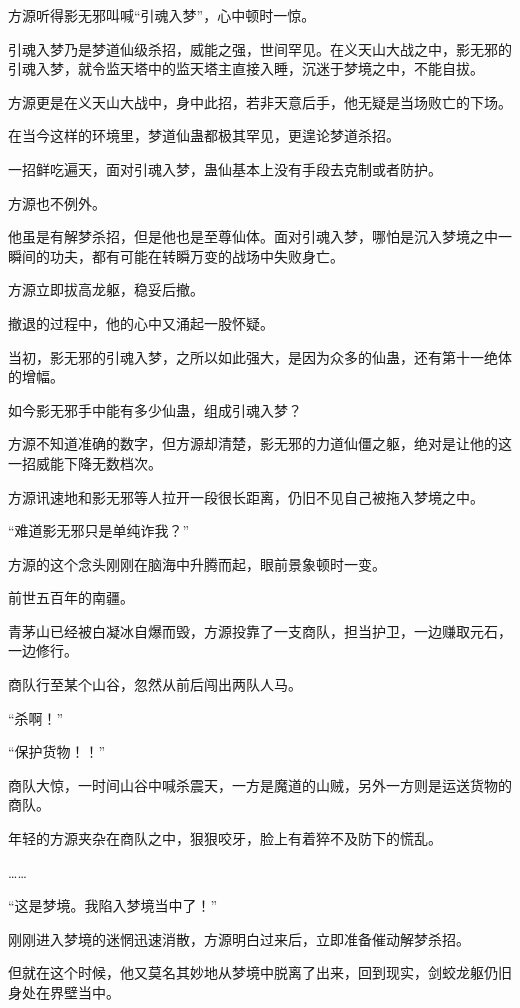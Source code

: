 
\begin{this_body}

方源听得影无邪叫喊“引魂入梦”，心中顿时一惊。

引魂入梦乃是梦道仙级杀招，威能之强，世间罕见。在义天山大战之中，影无邪的引魂入梦，就令监天塔中的监天塔主直接入睡，沉迷于梦境之中，不能自拔。

方源更是在义天山大战中，身中此招，若非天意后手，他无疑是当场败亡的下场。

在当今这样的环境里，梦道仙蛊都极其罕见，更遑论梦道杀招。

一招鲜吃遍天，面对引魂入梦，蛊仙基本上没有手段去克制或者防护。

方源也不例外。

他虽是有解梦杀招，但是他也是至尊仙体。面对引魂入梦，哪怕是沉入梦境之中一瞬间的功夫，都有可能在转瞬万变的战场中失败身亡。

方源立即拔高龙躯，稳妥后撤。

撤退的过程中，他的心中又涌起一股怀疑。

当初，影无邪的引魂入梦，之所以如此强大，是因为众多的仙蛊，还有第十一绝体的增幅。

如今影无邪手中能有多少仙蛊，组成引魂入梦？

方源不知道准确的数字，但方源却清楚，影无邪的力道仙僵之躯，绝对是让他的这一招威能下降无数档次。

方源讯速地和影无邪等人拉开一段很长距离，仍旧不见自己被拖入梦境之中。

“难道影无邪只是单纯诈我？”

方源的这个念头刚刚在脑海中升腾而起，眼前景象顿时一变。

前世五百年的南疆。

青茅山已经被白凝冰自爆而毁，方源投靠了一支商队，担当护卫，一边赚取元石，一边修行。

商队行至某个山谷，忽然从前后闯出两队人马。

“杀啊！”

“保护货物！！”

商队大惊，一时间山谷中喊杀震天，一方是魔道的山贼，另外一方则是运送货物的商队。

年轻的方源夹杂在商队之中，狠狠咬牙，脸上有着猝不及防下的慌乱。

……

“这是梦境。我陷入梦境当中了！”

刚刚进入梦境的迷惘迅速消散，方源明白过来后，立即准备催动解梦杀招。

但就在这个时候，他又莫名其妙地从梦境中脱离了出来，回到现实，剑蛟龙躯仍旧身处在界壁当中。


\end{this_body}

